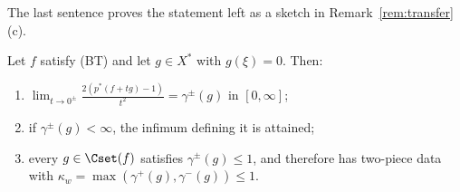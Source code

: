 The last sentence proves the statement left as a sketch in
Remark~\ref{rem:transfer}(c).

\begin{theorem}\label{thm:onesided}
Let $f$ satisfy \textup{(BT)} and let $g\in X^*$ with $g(\xi)=0$.  Then:
\begin{enumerate}
\item[(a)] $\displaystyle\lim_{t\to0^\pm}\frac{2(p^*(f+tg)-1)}{t^2}=
\gamma^\pm(g)$ in $[0,\infty]$;
\item[(b)] if $\gamma^\pm(g)<\infty$, the infimum defining it is attained;
\item[(c)] every $g\in\Cset(f)$ satisfies $\gamma^\pm(g)\le1$, and therefore
has two-piece data with $\kappa_w=\max(\gamma^+(g),\gamma^-(g))\le1$.
\end{enumerate}
\end{theorem}

